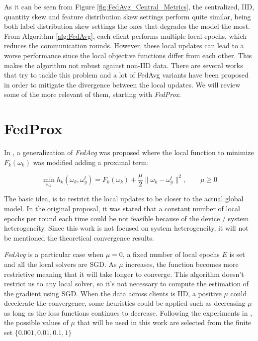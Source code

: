 As it can be seen from Figure \ref{fig:FedAvg_Central_Metrics}, the centralized, IID, quantity skew and feature distribution skew settings perform quite similar, being both label distribution skew settings the ones that degrades the model the most. From Algorithm \ref{alg:FedAvg}, each client performs multiple local epochs, which reduces the communication rounds. However, these local updates can lead to a worse performance since the local objective functions differ from each other. This makes the algorithm not robust against non-IID data. There are several works that try to tackle this problem and a lot of FedAvg variants have been proposed in order to mitigate the divergence between the local updates. We will review some of the more relevant of them, starting with \textit{FedProx}.

\section{FedProx}

In \cite*{li2020}, a generalization of \textit{FedAvg} was proposed where the local function to minimize $F_k(\omega_k)$ was modified adding a proximal term:

\begin{equation}
  \min_{\omega_k} h_k (\omega_k, \omega_g^t) = F_k(\omega_k) + \frac{\mu}{2} \lVert \omega_k - \omega_g^t \rVert^2, \qquad \mu \geq 0
\end{equation}

The basic idea, is to restrict the local updates to be closer to the actual global model. In the original proposal, it was stated that a constant number of local epochs per round each time could be not feasible because of the device / system heterogeneity. Since this work is not focused on system heterogeneity, it will not be mentioned the theoretical convergence results.

\textit{FedAvg} is a particular case when $\mu = 0$, a fixed number of local epochs $E$ is set and all the local solvers are SGD. As $\mu$ increases, the function becomes more restrictive meaning that it will take longer to converge. This algorithm doesn't restrict us to any local solver, so it's not necessary to compute the estimation of the gradient using SGD.
When the data across clients is IID, a positive $\mu$ could decelerate the convergence, some heuristics could be applied such as decreasing $\mu$ as long as the loss functions continues to decrease. Following the experiments in \cite*{li2020}, the possible values of $\mu$ that will be used in this work are selected from the finite set $\{0.001, 0.01, 0.1, 1\}$

